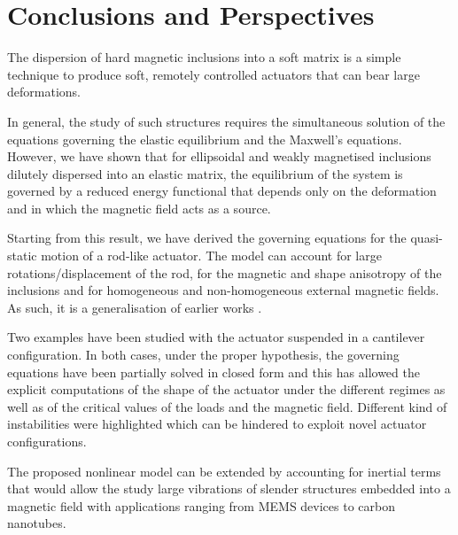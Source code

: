\documentclass[oneside]{article}
\begin{document}
			
			\section{Conclusions and  Perspectives}
			
			The dispersion of hard magnetic inclusions into a soft matrix is a simple technique to produce soft, remotely controlled actuators that can bear large deformations.
			
			In general, the study of such structures requires the simultaneous solution of the equations governing the elastic equilibrium and the Maxwell's equations. However, we have shown that for ellipsoidal and weakly magnetised inclusions dilutely dispersed into an elastic matrix, the equilibrium of the system is governed by a reduced energy functional that depends only on the deformation and in which the magnetic field acts as a source.
			
			Starting from this result, we have derived the governing equations for the quasi-static motion of a rod-like actuator. {The model can account for large rotations/displacement of the rod, for the magnetic and shape anisotropy of the inclusions and for homogeneous and non-homogeneous external magnetic fields. As such, it is a generalisation of earlier works \cite{Kimura2012,Gerbal2015,Stanier2016}}. 
			
			Two examples have been studied with the actuator suspended in a cantilever configuration. In both cases, under the proper hypothesis, the governing equations have been partially solved in closed form and this has allowed the explicit computations of the shape of the actuator under the different regimes as well as of the critical values of the loads and the magnetic field. Different kind of instabilities were highlighted which can be hindered to exploit novel actuator configurations.
			
			The proposed nonlinear model can be extended by accounting for inertial terms that would allow the study large vibrations of slender structures embedded into a magnetic field with applications ranging from MEMS devices to carbon nanotubes.\vspace{-0.3cm}
			
\end{document}
